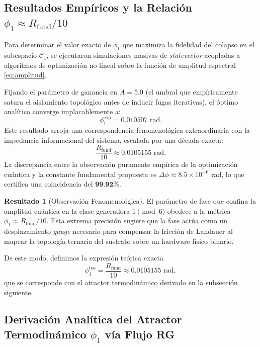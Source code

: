 \documentclass[12pt,a4paper]{article}
\theoremstyle{plain}
\theoremstyle{definition}
\newtheorem{resultado}[teorema]{Resultado}
\theoremstyle{remark}
\begin{document}
\subsection{Resultados Empíricos y la Relación $\phi_1 \approx R_{\text{fund}}/10$}

Para determinar el valor exacto de $\phi_1$ que maximiza la fidelidad del colapso en el subespacio $\mathcal{C}_1$, se ejecutaron simulaciones masivas de \textit{statevector} acopladas a algoritmos de optimización no lineal sobre la función de amplitud espectral \eqref{eq:amplitud}. 

Fijando el parámetro de ganancia en $A = 5.0$ (el umbral que empíricamente satura el aislamiento topológico antes de inducir fugas iterativas), el óptimo analítico converge implacablemente a:
\begin{equation}
\phi_1^{\text{exp}} = 0.010507 \text{ rad}.
\end{equation}
Este resultado arroja una correspondencia fenomenológica extraordinaria con la impedancia informacional del sistema, escalada por una década exacta:
\begin{equation}
\frac{R_{\text{fund}}}{10} \approx 0.0105155 \text{ rad}.
\end{equation}
La discrepancia entre la observación puramente empírica de la optimización cuántica y la constante fundamental propuesta es $\Delta\phi \approx 8.5 \times 10^{-6}$ rad, lo que certifica una coincidencia del $\textbf{99.92\%}$. 

\begin{resultado}[Observación Fenomenológica]
El parámetro de fase que confina la amplitud cuántica en la clase generadora $1 \pmod 6$ obedece a la métrica $\phi_1 \approx R_{\text{fund}}/10$. Esta extrema precisión sugiere que la fase actúa como un desplazamiento \textit{gauge} necesario para compensar la fricción de Landauer al mapear la topología ternaria del sustrato sobre un hardware físico binario.
\end{resultado}

De este modo, definimos la expresión teórica exacta
\begin{equation}
\phi_1^{\text{teo}} = \frac{R_{\text{fund}}}{10} \approx 0.0105155 \text{ rad},
\label{eq:phi1_teo}
\end{equation}
que se corresponde con el atractor termodinámico derivado en la subsección siguiente.

\subsection{Derivación Analítica del Atractor Termodinámico $\phi_1$ vía Flujo RG}
\label{sec:derivacion_phi1}
\end{document}
